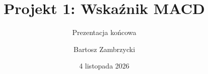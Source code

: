 \documentclass[t,aspectratio=169,11pt]{beamer}
\title{Projekt 1: Wskaźnik MACD}
\subtitle{Prezentacja końcowa}
\author{Bartosz Zambrzycki}
\institute{Metody numeryczne}
\date{4 listopada 2026}
\begin{document}
\begin{frame}[c]
  \titlepage
\end{frame}







\end{document}
